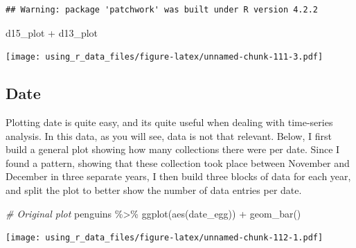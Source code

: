 \documentclass[
]{book}
\newenvironment{Shaded}{\begin{snugshade}}{\end{snugshade}}
\newcommand{\CommentTok}[1]{\textcolor[rgb]{0.56,0.35,0.01}{\textit{#1}}}
\newcommand{\FunctionTok}[1]{\textcolor[rgb]{0.00,0.00,0.00}{#1}}
\newcommand{\NormalTok}[1]{#1}
\newcommand{\SpecialCharTok}[1]{\textcolor[rgb]{0.00,0.00,0.00}{#1}}
\begin{document}
\begin{verbatim}
## Warning: package 'patchwork' was built under R version 4.2.2
\end{verbatim}

\begin{Shaded}
\begin{Highlighting}[]
\NormalTok{d15\_plot }\SpecialCharTok{+}\NormalTok{ d13\_plot}
\end{Highlighting}
\end{Shaded}

\texttt{[image: using\_r\_data\_files/figure-latex/unnamed-chunk-111-3.pdf]}

\hypertarget{date-1}{%
\subsection{Date}\label{date-1}}

Plotting date is quite easy, and its quite useful when dealing with time-series analysis.
In this data, as you will see, data is not that relevant.
Below, I first build a general plot showing how many collections there were per date.
Since I found a pattern, showing that these collection took place between November and December in three separate years, I then build three blocks of data for each year, and split the plot to better show the number of data entries per date.

\begin{Shaded}
\begin{Highlighting}[]
\CommentTok{\# Original plot}
\NormalTok{penguins }\SpecialCharTok{\%\textgreater{}\%} 
  \FunctionTok{ggplot}\NormalTok{(}\FunctionTok{aes}\NormalTok{(date\_egg)) }\SpecialCharTok{+}
  \FunctionTok{geom\_bar}\NormalTok{()}
\end{Highlighting}
\end{Shaded}

\texttt{[image: using\_r\_data\_files/figure-latex/unnamed-chunk-112-1.pdf]}
\end{document}
